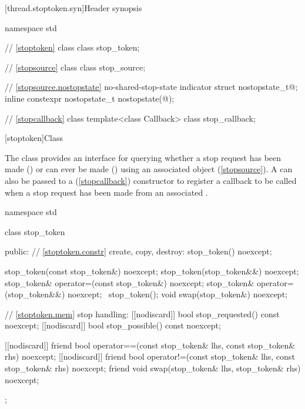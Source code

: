 {%
[thread.stoptoken.syn]{Header  synopsis}
%

\begin{codeblock}
namespace std {
  // \ref{stoptoken} class 
  class stop_token;

  // \ref{stopsource} class 
  class stop_source;

  // \ref{stopsource.nostopstate} no-shared-stop-state indicator
  struct nostopstate_t{@\seebelow@};
  inline constexpr nostopstate_t nostopstate(@\unspec@);

  // \ref{stopcallback} class 
  template<class Callback>
  class stop_callback;
}
\end{codeblock}


%
[stoptoken]{Class }

\pnum
{}%
The class  provides an interface for querying whether
a stop request has been made () or can ever be made
() using an associated  object (\ref{stopsource}).
A  can also be passed to a
 (\ref{stopcallback}) constructor
to register a callback to be called when a stop request has been made from
an associated . 

\begin{codeblock}
namespace std {
  class stop_token {
  public:
    // \ref{stoptoken.constr} create, copy, destroy:
    stop_token() noexcept;

    stop_token(const stop_token&) noexcept;
    stop_token(stop_token&&) noexcept;
    stop_token& operator=(const stop_token&) noexcept;
    stop_token& operator=(stop_token&&) noexcept;
    ~stop_token();
    void swap(stop_token&) noexcept;

    // \ref{stoptoken.mem} stop handling:
    [[nodiscard]] bool stop_requested() const noexcept;
    [[nodiscard]] bool stop_possible() const noexcept;

    [[nodiscard]] friend bool operator==(const stop_token& lhs, const stop_token& rhs) noexcept;
    [[nodiscard]] friend bool operator!=(const stop_token& lhs, const stop_token& rhs) noexcept;
    friend void swap(stop_token& lhs, stop_token& rhs) noexcept;
  };
}
\end{codeblock}


}
